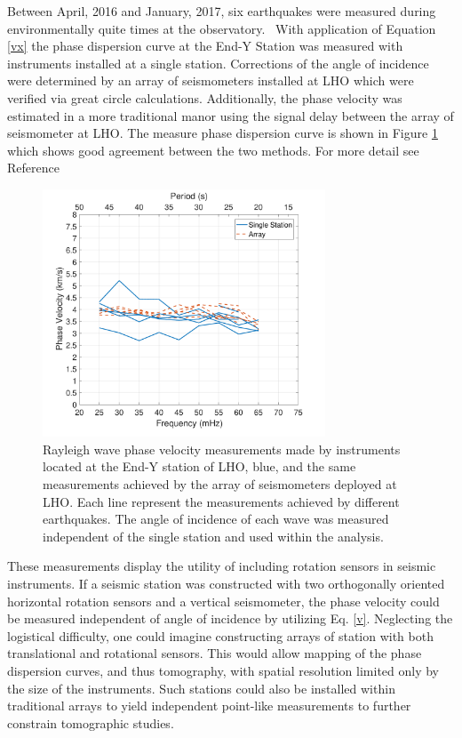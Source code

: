 \documentclass [12pt, proquest]{uwthesis}[2019]
\begin{document}
Between April, 2016 and January, 2017, six earthquakes were measured during environmentally quite times at the observatory.~\cite{tiltSeismology} With application of Equation \ref{vx} the phase dispersion curve at the End-Y Station was measured with instruments installed at a single station. Corrections of the angle of incidence were determined by an array of seismometers installed at LHO which were verified via great circle calculations. Additionally, the phase velocity was estimated in a more traditional manor using the signal delay between the array of seismometer at LHO. The measure phase dispersion curve is shown in Figure \ref{Phase_Hanford} which shows good agreement between the two methods. For more detail see Reference~\cite{tiltSeismology}
 
\begin{figure}%
\begin{center}
\includegraphics[width=0.75\textwidth]{Vel.pdf}
\caption[Single station Rayleigh wave phase velocity measurements]{Rayleigh wave phase velocity measurements made by instruments located at the End-Y station of LHO, blue, and the same measurements achieved by the array of seismometers deployed at LHO. Each line represent the measurements achieved by different earthquakes. The angle of incidence of each wave was measured independent of the single station and used within the analysis.~\cite{tiltSeismology}}
\label{Phase_Hanford}
\end{center}
\end{figure}

These measurements display the utility of including rotation sensors in seismic instruments. If a seismic station was constructed with two orthogonally oriented horizontal rotation sensors and a vertical seismometer, the phase velocity could be measured independent of angle of incidence by utilizing Eq. \ref{v}. Neglecting the logistical difficulty, one could imagine constructing arrays of station with both translational and rotational sensors. This would allow mapping of the phase dispersion curves, and thus tomography, with spatial resolution limited only by the size of the instruments. Such stations could also be installed within traditional arrays to yield independent point-like measurements to further constrain tomographic studies.
\end{document}
